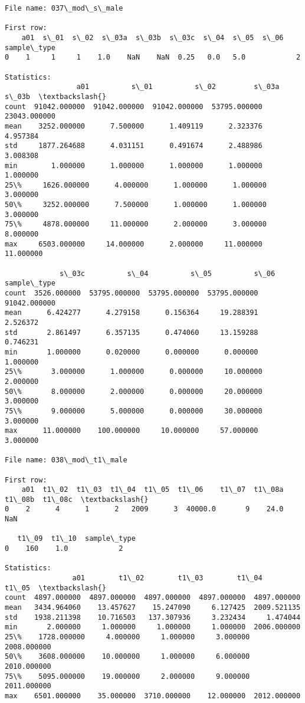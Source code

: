 \documentclass[11pt]{article}
\begin{document}
\begin{Verbatim}[commandchars=\\\{\}]
File name: 037\_mod\_s\_male

First row: 
    a01  s\_01  s\_02  s\_03a  s\_03b  s\_03c  s\_04  s\_05  s\_06  sample\_type
0    1     1     1    1.0    NaN    NaN  0.25   0.0   5.0            2

Statistics: 
                 a01          s\_01          s\_02         s\_03a         s\_03b  \textbackslash{}
count  91042.000000  91042.000000  91042.000000  53795.000000  23043.000000   
mean    3252.000000      7.500000      1.409119      2.323376      4.957384   
std     1877.264688      4.031151      0.491674      2.488986      3.008308   
min        1.000000      1.000000      1.000000      1.000000      1.000000   
25\%     1626.000000      4.000000      1.000000      1.000000      3.000000   
50\%     3252.000000      7.500000      1.000000      1.000000      3.000000   
75\%     4878.000000     11.000000      2.000000      3.000000      8.000000   
max     6503.000000     14.000000      2.000000     11.000000     11.000000   

             s\_03c          s\_04          s\_05          s\_06   sample\_type  
count  3526.000000  53795.000000  53795.000000  53795.000000  91042.000000  
mean      6.424277      4.279158      0.156364     19.288391      2.526372  
std       2.861497      6.357135      0.474060     13.159288      0.746231  
min       1.000000      0.020000      0.000000      0.000000      1.000000  
25\%       3.000000      1.000000      0.000000     10.000000      2.000000  
50\%       8.000000      2.000000      0.000000     20.000000      3.000000  
75\%       9.000000      5.000000      0.000000     30.000000      3.000000  
max      11.000000    100.000000     10.000000     57.000000      3.000000  

File name: 038\_mod\_t1\_male

First row: 
    a01  t1\_02  t1\_03  t1\_04  t1\_05  t1\_06    t1\_07  t1\_08a  t1\_08b  t1\_08c  \textbackslash{}
0    2      4      1      2   2009      3  40000.0       9    24.0     NaN   

   t1\_09  t1\_10  sample\_type  
0    160    1.0            2  

Statistics: 
                a01        t1\_02        t1\_03        t1\_04        t1\_05  \textbackslash{}
count  4897.000000  4897.000000  4897.000000  4897.000000  4897.000000   
mean   3434.964060    13.457627    15.247090     6.127425  2009.521135   
std    1938.211398    10.716503   137.307936     3.232434     1.474044   
min       2.000000     1.000000     1.000000     1.000000  2006.000000   
25\%    1728.000000     4.000000     1.000000     3.000000  2008.000000   
50\%    3608.000000    10.000000     1.000000     6.000000  2010.000000   
75\%    5095.000000    19.000000     2.000000     9.000000  2011.000000   
max    6501.000000    35.000000  3710.000000    12.000000  2012.000000   


\end{Verbatim}
\end{document}
